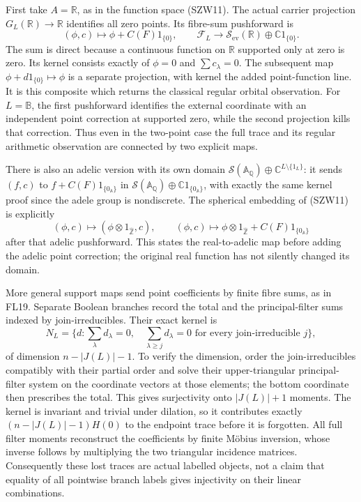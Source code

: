 \documentclass[
  10pt,
  a4paper,
]{article}
\begin{document}
First take \(A=\mathbb R\), as in the function space (SZW11). The actual
carrier projection \(G_L(\mathbb R)\to\mathbb R\) identifies all zero
points. Its fibre-sum pushforward is \[
(\phi,c)\longmapsto\phi+C(F)1_{\{0\}},
\qquad
\mathcal F_L\longrightarrow
\mathcal S_{\mathrm{ev}}(\mathbb R)\oplus\mathbb C1_{\{0\}}.
\tag{SZW36}
\] The sum is direct because a continuous function on \(\mathbb R\)
supported only at zero is zero. Its kernel consists exactly of
\(\phi=0\) and \(\sum c_\lambda=0\). The subsequent map
\(\phi+d1_{\{0\}}\mapsto\phi\) is a separate projection, with kernel the
added point-function line. It is this composite which returns the
classical regular orbital observation. For \(L=\mathbb B\), the first
pushforward identifies the external coordinate with an independent point
correction at supported zero, while the second projection kills that
correction. Thus even in the two-point case the full trace and its
regular arithmetic observation are connected by two explicit maps.

There is also an adelic version with its own domain
\(\mathcal S(\mathbb A_{\mathbb Q})\oplus\mathbb C^{L\setminus\{1_L\}}\):
it sends \((f,c)\) to \(f+C(F)1_{\{0_{\mathbb A}\}}\) in
\(\mathcal S(\mathbb A_{\mathbb Q})\oplus\mathbb C1_{\{0_{\mathbb A}\}}\),
with exactly the same kernel proof since the adele group is nondiscrete.
The spherical embedding of (SZW11) is explicitly \[
(\phi,c)\longmapsto(\phi\otimes1_{\widehat{\mathbb Z}},c),
\qquad
(\phi,c)\longmapsto
\phi\otimes1_{\widehat{\mathbb Z}}+C(F)1_{\{0_{\mathbb A}\}}
\tag{SZW36a}
\] after that adelic pushforward. This states the real-to-adelic map
before adding the adelic point correction; the original real function
has not silently changed its domain.

More general support maps send point coefficients by finite fibre sums,
as in FL19. Separate Boolean branches record the total and the
principal-filter sums indexed by join-irreducibles. Their exact kernel
is \[
N_L=\{d:\sum_\lambda d_\lambda=0,\quad
\sum_{\lambda\ge j}d_\lambda=0\text{ for every join-irreducible }j\},
\tag{SZW37}
\] of dimension \(n-|J(L)|-1\). To verify the dimension, order the
join-irreducibles compatibly with their partial order and solve their
upper-triangular principal-filter system on the coordinate vectors at
those elements; the bottom coordinate then prescribes the total. This
gives surjectivity onto \(|J(L)|+1\) moments. The kernel is invariant
and trivial under dilation, so it contributes exactly
\((n-|J(L)|-1)H(0)\) to the endpoint trace before it is forgotten. All
full filter moments reconstruct the coefficients by finite Möbius
inversion, whose inverse follows by multiplying the two triangular
incidence matrices. Consequently these lost traces are actual labelled
objects, not a claim that equality of all pointwise branch labels gives
injectivity on their linear combinations.
\end{document}
